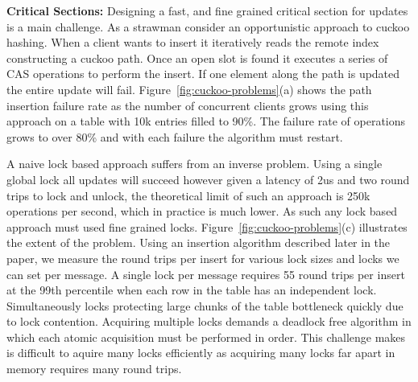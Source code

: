 \textbf{Critical Sections:} Designing a fast, and fine
grained critical section for updates is a main challenge. As
a strawman consider an opportunistic approach to cuckoo
hashing. When a client wants to insert it iteratively reads
the remote index constructing a cuckoo path. Once an open
slot is found it executes a series of CAS operations to
perform the insert. If one element along the path is updated
the entire update will fail.
Figure~\ref{fig:cuckoo-problems}(a) shows the path insertion
failure rate as the number of concurrent clients grows using
this approach on a table with 10k entries filled to 90\%.
The failure rate of operations grows to over 80\% and with each
failure the algorithm must restart.

A naive lock based approach suffers from an inverse problem.
Using a single global lock all updates will succeed however
given a latency of 2us and two round trips to lock and
unlock, the theoretical limit of such an approach is 250k
operations per second, which in practice is much lower. As
such any lock based approach must used fine grained locks.
Figure~\ref{fig:cuckoo-problems}(c) illustrates the extent
of the problem. Using an insertion algorithm described later
in the paper, we measure the round trips per insert for
various lock sizes and locks we can set per message. A
single lock per message requires 55 round trips per insert
at the 99th percentile when each row in the table has an
independent lock. Simultaneously locks protecting large
chunks of the table bottleneck quickly due to lock
contention.  Acquiring multiple locks demands a deadlock
free algorithm in which each atomic acquisition must be
performed in order.  This challenge makes is difficult to
aquire many locks efficiently as acquiring many locks far
apart in memory requires many round trips.


